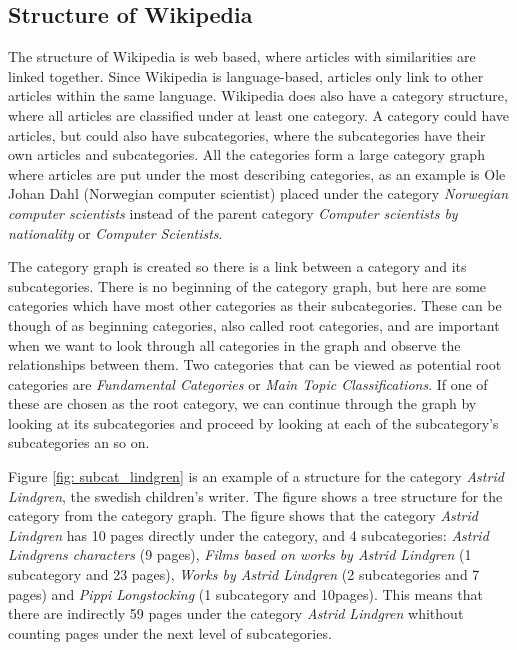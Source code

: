 \subsection{Structure of Wikipedia}
The structure of Wikipedia is web based, where articles with similarities are linked together. Since Wikipedia is language-based, articles only link to other articles within the same language. Wikipedia does also have a category structure, where all articles are classified under at least one category. A category could have articles, but could also have subcategories, where the subcategories have their own articles and subcategories. All the categories form a large category graph where articles are put under the most describing categories, as an example is Ole Johan Dahl \cite{Olejohandahleng} (Norwegian computer scientist) placed under the category \emph{Norwegian computer scientists} instead of the parent category \emph{Computer scientists by nationality} or \emph{Computer Scientists}. 

The category graph is created so there is a link between a category and its subcategories. There is no beginning of the category graph, but here are some categories which have most other categories as their subcategories. These can be though of as beginning categories, also called root categories, and are important when we want to look through all categories in the graph and observe the relationships between them.  Two categories that can be viewed as potential root categories are \emph{Fundamental Categories} or \emph{Main Topic Classifications}. If one of these are chosen as the root category, we can continue through the graph by looking at its subcategories and proceed by looking at each of the subcategory's subcategories an so on.

Figure \ref{fig: subcat_lindgren} is an example of a structure for the category \emph{Astrid Lindgren}, the swedish children's writer. The figure shows a tree structure for the category from the category graph. The figure shows that the category \emph{Astrid Lindgren} has 10 pages directly under the category, and 4 subcategories: \emph{Astrid Lindgrens characters} (9 pages), \emph{Films based on works by Astrid Lindgren} (1 subcategory and 23 pages), \emph{Works by Astrid Lindgren} (2 subcategories and 7 pages) and \emph{Pippi Longstocking} (1 subcategory and 10pages).  This means that there are indirectly 59 pages under the category \emph{Astrid Lindgren} whithout counting pages under the next level of subcategories. 


